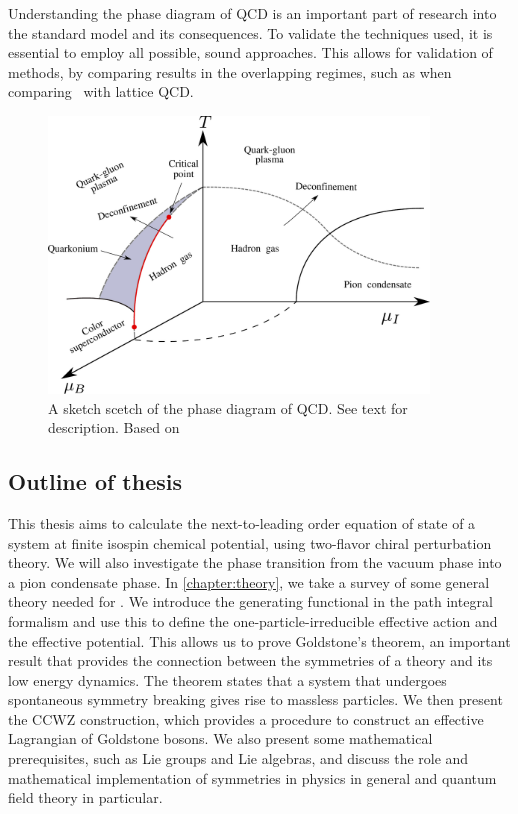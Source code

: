 Understanding the phase diagram of QCD is an important part of research into the standard model and its consequences.
To validate the techniques used, it is essential to employ all possible, sound approaches.
This allows for validation of methods, by comparing results in the overlapping regimes, such as when comparing \chpt\ with lattice QCD.

\begin{figure}[h]
    \centering
    \includegraphics[width=0.9\textwidth]{figurer/phase_diagram2.pdf}
    \caption{A sketch scetch of the phase diagram of QCD. See text for description. Based on~\cite{from_hadrons_to_quarks,
    Brandt:QCD_phase_diagram_with_isospin_chemical_potential,Brandt:QCD_phase_diagram_for_nonzero_isospin-asymmetry,Fukushima:The_phase_diagram_of_dense_QCD,mannarelli:meson_condensation}
    }
    \label{fig:phase diag qcd}
\end{figure}

\subsection*{Outline of thesis}
This thesis aims to calculate the next-to-leading order equation of state of a system at finite isospin chemical potential, using two-flavor chiral perturbation theory.
We will also investigate the phase transition from the vacuum phase into a pion condensate phase.
In \autoref{chapter:theory}, we take a survey of some general theory needed for \chpt.
We introduce the generating functional in the path integral formalism and use this to define the one-particle-irreducible effective action and the effective potential.
This allows us to prove Goldstone's theorem, an important result that provides the connection between the symmetries of a theory and its low energy dynamics.
The theorem states that a system that undergoes spontaneous symmetry breaking gives rise to massless particles.
We then present the CCWZ construction, which provides a procedure to construct an effective Lagrangian of Goldstone bosons.
We also present some mathematical prerequisites, such as Lie groups and Lie algebras, and discuss the role and mathematical implementation of symmetries in physics in general and quantum field theory in particular.

